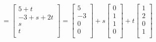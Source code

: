 \begin{Answer}
\begin{equation*}
=
\begin{bmatrix}
5+t\\
-3+s+2t\\
s\\
t\\    
\end{bmatrix}
=
\begin{bmatrix}
5\\
-3\\
0\\
0\\
\end{bmatrix}
+s
\begin{bmatrix}
0\\
1\\
1\\
0\\
\end{bmatrix}
+t
\begin{bmatrix}
1\\
2\\
0\\
1\\
\end{bmatrix}
\end{equation*}
\end{Answer}

